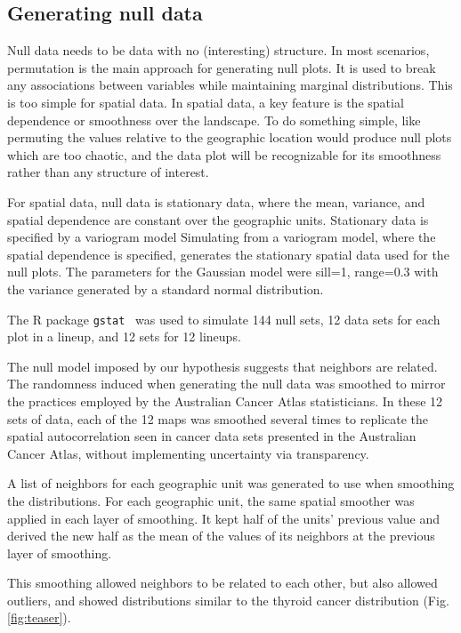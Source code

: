 \documentclass[journal]{vgtc}                     %
\begin{document}
\hypertarget{generating-null-data}{%
\subsection{Generating null data}\label{generating-null-data}}

Null data needs to be data with no (interesting) structure. In most scenarios, permutation is the main approach for generating null plots. It is used to break any associations between variables while maintaining marginal distributions. This is too simple for spatial data. In spatial data, a key feature is the spatial dependence or smoothness over the landscape. To do something simple, like permuting the values relative to the geographic location would produce null plots which are too chaotic, and the data plot will be recognizable for its smoothness rather than any structure of interest.

For spatial data, null data is stationary data, where the mean, variance, and spatial dependence are constant over the geographic units. Stationary data is specified by a variogram model \cite{POG} Simulating from a variogram model, where the spatial dependence is specified, generates the stationary spatial data used for the null plots. The parameters for the Gaussian model were sill=1, range=0.3 with the variance generated by a standard normal distribution.

The R package \texttt{gstat}~\cite{gstat} was used to simulate 144 null sets, 12 data sets for each plot in a lineup, and 12 sets for 12 lineups.

The null model imposed by our hypothesis suggests that neighbors are related. The randomness induced when generating the null data was smoothed to mirror the practices employed by the Australian Cancer Atlas statisticians.
In these 12 sets of data, each of the 12 maps was smoothed several times to replicate the spatial autocorrelation seen in cancer data sets presented in the Australian Cancer Atlas, without implementing uncertainty via transparency.

A list of neighbors for each geographic unit was generated to use when smoothing the distributions. For each geographic unit, the same spatial smoother was applied in each layer of smoothing. It kept half of the units' previous value and derived the new half as the mean of the values of its neighbors at the previous layer of smoothing.

This smoothing allowed neighbors to be related to each other, but also allowed outliers, and showed distributions similar to the thyroid cancer distribution (Fig. \ref{fig:teaser}).
\end{document}
